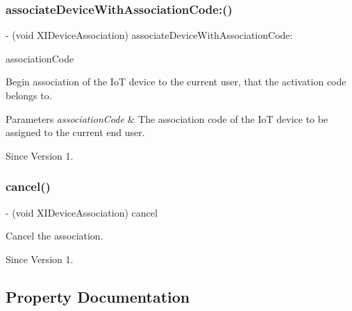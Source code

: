 \subsubsection{\texorpdfstring{associate\+Device\+With\+Association\+Code\+:()}{associateDeviceWithAssociationCode:()}}
{\footnotesize\ttfamily -\/ (void X\+I\+Device\+Association) associate\+Device\+With\+Association\+Code\+: \begin{DoxyParamCaption}\item[{(N\+S\+String $\ast$)}]{association\+Code }\end{DoxyParamCaption}}



Begin association of the IoT device to the current user, that the activation code belongs to. 


\begin{DoxyParams}{Parameters}
{\em association\+Code} & The association code of the IoT device to be assigned to the current end user. \\
\hline
\end{DoxyParams}
\begin{DoxySince}{Since}
Version 1. 
\end{DoxySince}
\hypertarget{protocol_x_i_device_association_01-p_a3e83f44defee4be07893de3e4029be8a}{}\label{protocol_x_i_device_association_01-p_a3e83f44defee4be07893de3e4029be8a} 
\subsubsection{\texorpdfstring{cancel()}{cancel()}}
{\footnotesize\ttfamily -\/ (void X\+I\+Device\+Association) cancel \begin{DoxyParamCaption}{ }\end{DoxyParamCaption}}



Cancel the association. 

\begin{DoxySince}{Since}
Version 1. 
\end{DoxySince}


\subsection{Property Documentation}
\hypertarget{protocol_x_i_device_association_01-p_a272fb3bd6bed9d86cc1fc1ba5f20912a}{}\label{protocol_x_i_device_association_01-p_a272fb3bd6bed9d86cc1fc1ba5f20912a} 
